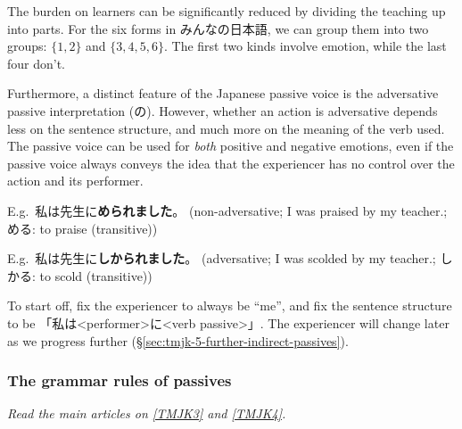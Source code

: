 \documentclass[../nihongo-gakushuu-kyouzai.tex]{subfiles}
\begin{document}
The burden on learners can be significantly reduced by dividing the teaching up into parts. For the six forms in みんなの日本語, we can group them into two groups: $\{1,2\}$ and $\{3,4,5,6\}$. The first two kinds involve emotion, while the last four don't.

Furthermore, a distinct feature of the Japanese passive voice is the adversative passive interpretation (の). However, whether an action is adversative depends less on the sentence structure, and much more on the meaning of the verb used.  The passive voice can be used for \emph{both} positive and negative emotions, even if the passive voice always conveys the idea that the experiencer has no control over the action and its performer.

E.g.\ 私は先生に\textbf{められました}。 (non-adversative; I was praised by my teacher.; める: to praise (transitive))

E.g.\ 私は先生に\textbf{しかられました}。 (adversative; I was scolded by my teacher.; しかる: to scold (transitive))

To start off, fix the experiencer to always be ``me'', and fix the sentence structure to be 「私は<performer>に<verb passive>」. The experiencer will change later as we progress further (\S\ref{sec:tmjk-5-further-indirect-passives}).


\subsubsection{The grammar rules of passives} \label{sec:tmjk-3-4-grammar-rules-of-the-direct-indirect-possessive-intransitive-passives}
\emph{Read the main articles on \href{https://www.tomojuku.com/blog/passive/passive-4/}{[TMJK3]} and \href{https://www.tomojuku.com/blog/firstlesson1/passive-5/}{[TMJK4]}.}
\end{document}
